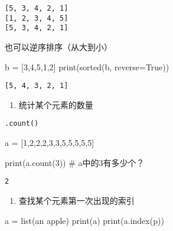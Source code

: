 \documentclass[
  letterpaper,
  DIV=11,
  numbers=noendperiod]{scrreprt}
\newenvironment{Shaded}{\begin{snugshade}}{\end{snugshade}}
\newcommand{\BuiltInTok}[1]{\textcolor[rgb]{0.00,0.23,0.31}{#1}}
\newcommand{\CommentTok}[1]{\textcolor[rgb]{0.37,0.37,0.37}{#1}}
\newcommand{\DecValTok}[1]{\textcolor[rgb]{0.68,0.00,0.00}{#1}}
\newcommand{\NormalTok}[1]{\textcolor[rgb]{0.00,0.23,0.31}{#1}}
\newcommand{\OperatorTok}[1]{\textcolor[rgb]{0.37,0.37,0.37}{#1}}
\newcommand{\StringTok}[1]{\textcolor[rgb]{0.13,0.47,0.30}{#1}}
\newcommand{\VariableTok}[1]{\textcolor[rgb]{0.07,0.07,0.07}{#1}}
\providecommand{\tightlist}{%
  \setlength{\itemsep}{0pt}\setlength{\parskip}{0pt}}\usepackage{longtable,booktabs,array}
\begin{document}
\begin{verbatim}
[5, 3, 4, 2, 1]
[1, 2, 3, 4, 5]
[5, 3, 4, 2, 1]
\end{verbatim}

也可以逆序排序（从大到小）

\begin{Shaded}
\begin{Highlighting}[]
\NormalTok{b }\OperatorTok{=}\NormalTok{ [}\DecValTok{3}\NormalTok{,}\DecValTok{4}\NormalTok{,}\DecValTok{5}\NormalTok{,}\DecValTok{1}\NormalTok{,}\DecValTok{2}\NormalTok{]}
\BuiltInTok{print}\NormalTok{(}\BuiltInTok{sorted}\NormalTok{(b, reverse}\OperatorTok{=}\VariableTok{True}\NormalTok{))}
\end{Highlighting}
\end{Shaded}

\begin{verbatim}
[5, 4, 3, 2, 1]
\end{verbatim}

\begin{enumerate}
\def\labelenumi{\arabic{enumi}.}
\setcounter{enumi}{4}
\tightlist
\item
  统计某个元素的数量
\end{enumerate}

\texttt{.count()}

\begin{Shaded}
\begin{Highlighting}[]
\NormalTok{a }\OperatorTok{=}\NormalTok{ [}\DecValTok{1}\NormalTok{,}\DecValTok{2}\NormalTok{,}\DecValTok{2}\NormalTok{,}\DecValTok{2}\NormalTok{,}\DecValTok{3}\NormalTok{,}\DecValTok{3}\NormalTok{,}\DecValTok{5}\NormalTok{,}\DecValTok{5}\NormalTok{,}\DecValTok{5}\NormalTok{,}\DecValTok{5}\NormalTok{,}\DecValTok{5}\NormalTok{]}

\BuiltInTok{print}\NormalTok{(a.count(}\DecValTok{3}\NormalTok{)) }\CommentTok{\# a中的3有多少个？}
\end{Highlighting}
\end{Shaded}

\begin{verbatim}
2
\end{verbatim}

\begin{enumerate}
\def\labelenumi{\arabic{enumi}.}
\setcounter{enumi}{5}
\tightlist
\item
  查找某个元素第一次出现的索引
\end{enumerate}

\begin{Shaded}
\begin{Highlighting}[]
\NormalTok{a }\OperatorTok{=} \BuiltInTok{list}\NormalTok{(}\StringTok{\textquotesingle{}an apple\textquotesingle{}}\NormalTok{)}
\BuiltInTok{print}\NormalTok{(a)}
\BuiltInTok{print}\NormalTok{(a.index(}\StringTok{\textquotesingle{}p\textquotesingle{}}\NormalTok{))}
\end{Highlighting}
\end{Shaded}
\end{document}
